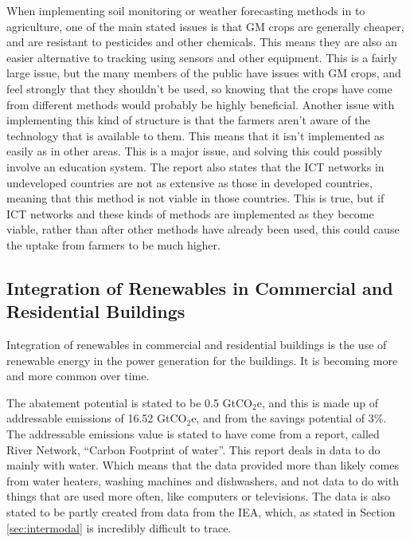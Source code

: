 When implementing soil monitoring or weather forecasting methods in to agriculture, one of the main stated issues is that GM crops are generally cheaper, and are resistant to pesticides and other chemicals. This means they are also an easier alternative to tracking using sensors and other equipment. This is a fairly large issue, but the many members of the public have issues with GM crops, and feel strongly that they shouldn't be used, so knowing that the crops have come from different methods would probably be highly beneficial.
Another issue with implementing this kind of structure is that the farmers aren't aware of the technology that is available to them. This means that it isn't implemented as easily as in other areas. This is a major issue, and solving this could possibly involve an education system.
The report also states that the ICT networks in undeveloped countries are not as extensive as those in developed countries, meaning that this method is not viable in those countries. This is true, but if ICT networks and these kinds of methods are implemented as they become viable, rather than after other methods have already been used, this could cause the uptake from farmers to be much higher.


\subsection{Integration of Renewables in Commercial and Residential Buildings}

Integration of renewables in commercial and residential buildings is the use of renewable energy in the power generation for the buildings. It is becoming more and more common over time.


The abatement potential is stated to be 0.5 GtCO$_2$e, and this is made up of addressable emissions of 16.52 GtCO$_2$e, and from the savings potential of 3\%.
The addressable emissions value is stated to have come from a report, called River Network, “Carbon Footprint of water”. This report deals in data to do mainly with water. Which means that the data provided more than likely comes from water heaters, washing machines and dishwashers, and not data to do with things that are used more often, like computers or televisions. The data is also stated to be partly created from data from the IEA, which, as stated in Section \ref{sec:intermodal} is incredibly difficult to trace. 


